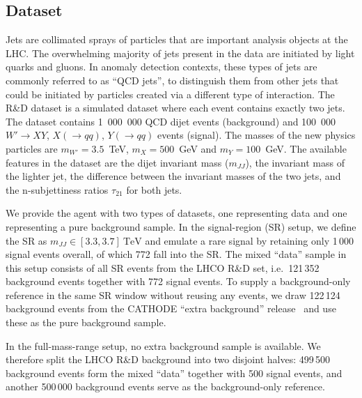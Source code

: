 \documentclass[submission, Phys]{SciPost}
\begin{document}
\subsection{Dataset}
Jets are collimated sprays of particles that are important analysis objects at the LHC. The overwhelming majority of jets present in the data are initiated by light quarks and gluons. In anomaly detection contexts, these types of jets are commonly referred to as ``QCD jets'', to distinguish them from other jets that could be initiated by particles created via a different type of interaction.   
The R\&D dataset is a simulated dataset where each event contains exactly two jets. The dataset contains 1~000~000 QCD dijet events (background) and 100~000 $W'\to XY$, $X (\to qq)$, $Y(\to qq)$ events (signal). The masses of the new physics particles are $m_{W'}=3.5$~TeV, $m_X=500$~GeV and $m_Y=100$~GeV. The available features in the dataset are the dijet invariant mass ($m_{JJ}$), the invariant mass of the lighter jet, the difference between the invariant masses of the two jets, and the n-subjettiness ratios $\tau_{21}$ for both jets.

We provide the agent with two types of datasets, one representing data and one representing a pure background sample. In the signal-region (SR) setup, we define the SR as $m_{JJ}\in[3.3,3.7]~\mathrm{TeV}$ and emulate a rare signal by retaining only 1\,000 signal events overall, of which 772 fall into the SR. The mixed ``data'' sample in this setup consists of all SR events from the LHCO R\&D set, i.e.\ 121\,352 background events together with 772 signal events. To supply a background-only reference in the same SR window without reusing any events, we draw 122\,124 background events from the CATHODE ``extra background'' release~\cite{Hallin:2021wme} and use these as the pure background sample. 

In the full-mass-range setup, no extra background sample is available. We therefore split the LHCO R\&D background into two disjoint halves: 499\,500 background events form the mixed ``data'' together with 500 signal events, and another 500\,000 background events serve as the background-only reference.  
\end{document}
